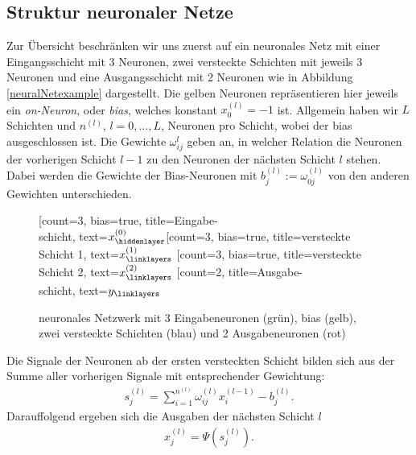 \subsection{Struktur neuronaler Netze}
\label{subsec:struktur-eines-neuronalen-netzes}
Zur Übersicht beschränken wir uns zuerst auf ein neuronales Netz mit einer Eingangsschicht mit $3$ Neuronen, zwei
versteckte Schichten mit jeweils 3 Neuronen und eine Ausgangsschicht mit 2 Neuronen wie in Abbildung
\eqref{neuralNetexample} dargestellt. Die gelben Neuronen repräsentieren hier jeweils ein \textit{on-Neuron}, oder
\textit{bias}, welches konstant $x_0^{(l)} = -1$ ist. Allgemein haben wir $L$ Schichten und $n^{(l)}$, $l=0, \dots, L$,
Neuronen pro Schicht, wobei der bias ausgeschlossen ist. Die Gewichte $\omega_{ij}^{l}$ geben an, in welcher Relation
die Neuronen der vorherigen Schicht $l-1$ zu den Neuronen der nächsten Schicht $l$ stehen. Dabei werden die Gewichte
der Bias-Neuronen mit $b_j^{(l)}:= \omega_{0j}^{(l)}$ von den anderen Gewichten unterschieden.
\begin{figure}[htp]
    \centering
    \begin{neuralnetwork}[height=4]
        \newcommand{\x}[2]{$x^{(0)}_#2$}
        \newcommand{\y}[2]{$y_#2$}
        \newcommand{\hfirst}[2]{\small $x^{(1)}_#2$}
        \newcommand{\hsecond}[2]{\small $x^{(2)}_#2$}
        [count=3, bias=true, title=Eingabe-\\schicht, text=\x]
        \hiddenlayer[count=3, bias=true, title=versteckte\\Schicht 1, text=\hfirst]
        \linklayers
        \hiddenlayer[count=3, bias=true, title=versteckte\\Schicht 2, text=\hsecond]
        \linklayers
        \outputlayer[count=2, title=Ausgabe-\\schicht, text=\y] \linklayers
    \end{neuralnetwork}
    \caption{neuronales Netzwerk mit 3 Eingabeneuronen (grün), bias (gelb), zwei versteckte Schichten
        (blau) und 2 Ausgabeneuronen (rot)}
    \label{neuralNetexample}
\end{figure}
Die Signale der Neuronen ab der ersten versteckten Schicht bilden sich aus der Summe aller vorherigen
Signale mit entsprechender Gewichtung:
\begin{align}
    s_j^{(l)} = \sum_{i=1}^{n^{(l)}} \omega_{ij}^{(l)} x_i^{(l-1)} - b_j^{(l)}. \label{eq:signal}
\end{align}
Darauffolgend ergeben sich die Ausgaben der nächsten Schicht $l$
\begin{align}
    x_j^{(l)}=\Psi(s_j^{(l)}). \label{eq:activ}
\end{align}
